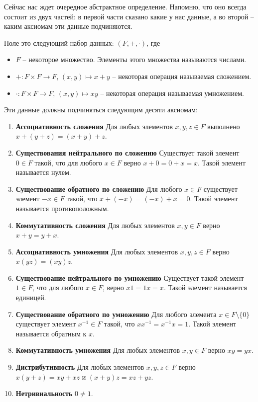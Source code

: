 Сейчас нас ждет очередное абстрактное определение. Напомню, что оно всегда состоит из двух частей: в первой части сказано какие у нас данные, а во второй -- каким аксиомам эти данные подчиняются.

\begin{definition}[Поле]
Поле это следующий набор данных: $(F, + , \cdot)$, где
\begin{itemize}
\item $F$ -- некоторое множество. Элементы этого множества называются числами.
\item $+\colon F\times F\to F$, $(x,y)\mapsto x+y$ -- некоторая операция называемая сложением.
\item $\cdot\colon F\times F\to F$, $(x,y)\mapsto xy$ -- некоторая операция называемая умножением.
\end{itemize}
Эти данные должны подчиняться следующим десяти аксиомам:
\begin{enumerate}
\item {\bf Ассоциативность сложения} Для любых элементов $x,y,z\in F$ выполнено $x+(y+z) = (x+y)+z$.
\item {\bf Существования нейтрального по сложению} Существует такой элемент $0\in F$ такой, что для любого $x\in F$ верно $x + 0 = 0 + x = x$. Такой элемент называется нулем.
\item {\bf Существование обратного по сложению} Для любого $x\in F$ существует элемент $-x\in F$ такой, что $x + (-x) = (-x) + x = 0$. Такой элемент называется противоположным.
\item {\bf Коммутативность сложения} Для любых элементов $x,y\in F$ верно $x+y = y+x$.

\item {\bf Ассоциативность умножения} Для любых элементов $x,y,z\in F$ верно $x(yz) = (xy)z$.
\item {\bf Существование нейтрального по умножению} Существует такой элемент $1\in F$, что для любого $x\in F$, верно $x 1 = 1 x = x$. Такой элемент называется единицей.
\item {\bf Существование обратного по умножению} Для любого элемента $x\in F\setminus\{0\}$ существует элемент $x^{-1}\in F$ такой, что $x x^{-1} = x^{-1}x = 1$. Такой элемент называется обратным к $x$.
\item {\bf Коммутативность умножения} Для любых элементов $x,y\in F$ верно $xy = yx$.
\item {\bf Дистрибутивность} Для любых элементов $x,y,z\in F$ верно $x(y+z) = xy + xz$ и $(x+y)z = xz + yz$.
\item {\bf Нетривиальность} $0\neq 1$.
\end{enumerate}
\end{definition}

